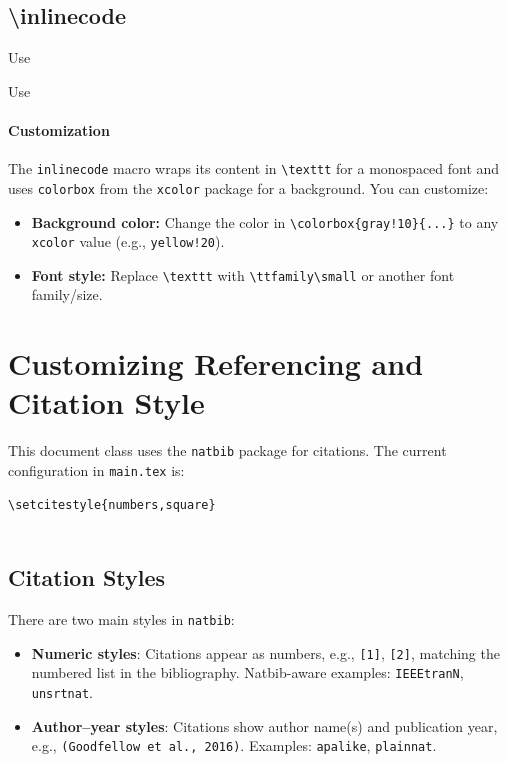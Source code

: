 \documentclass{lecturenotes}
\begin{document}
\subsection{\textbackslash inlinecode}\label{sec:inlinecode}
\begin{codeblock}
Use 
\end{codeblock}

Use 

\paragraph{Customization}
The \texttt{inlinecode} macro wraps its content in \verb|\texttt| for a monospaced font and uses \texttt{colorbox} from the \texttt{xcolor} package for a background.
You can customize:
\begin{itemize}
    \item \textbf{Background color:} Change the color in \verb|\colorbox{gray!10}{...}| to any \texttt{xcolor} value (e.g., \texttt{yellow!20}).
    \item \textbf{Font style:} Replace \verb|\texttt| with \verb|\ttfamily\small| or another font family/size.
\end{itemize}

\newpage
\section{Customizing Referencing and Citation Style}

This document class uses the \texttt{natbib} package for citations.  
The current configuration in \texttt{main.tex} is:
\begin{verbatim}
\setcitestyle{numbers,square}


\end{verbatim}

\subsection{Citation Styles}
There are two main styles in \texttt{natbib}:

\begin{itemize}
    \item \textbf{Numeric styles}: Citations appear as numbers, e.g., \texttt{[1]}, \texttt{[2]}, matching the numbered list in the bibliography.  
    Natbib-aware examples: \texttt{IEEEtranN}, \texttt{unsrtnat}.
    \item \textbf{Author–year styles}: Citations show author name(s) and publication year, e.g., \texttt{(Goodfellow et al., 2016)}.  
    Examples: \texttt{apalike}, \texttt{plainnat}.
\end{itemize}
\end{document}

